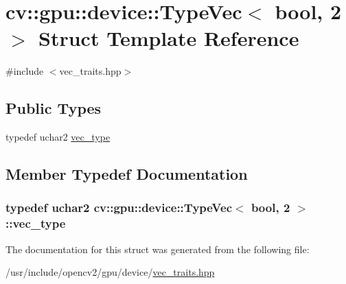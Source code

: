 \hypertarget{structcv_1_1gpu_1_1device_1_1TypeVec_3_01bool_00_012_01_4}{\section{cv\-:\-:gpu\-:\-:device\-:\-:Type\-Vec$<$ bool, 2 $>$ Struct Template Reference}
\label{structcv_1_1gpu_1_1device_1_1TypeVec_3_01bool_00_012_01_4}
}


{\ttfamily \#include $<$vec\-\_\-traits.\-hpp$>$}

\subsection*{Public Types}
\begin{DoxyCompactItemize}
\item 
typedef uchar2 \hyperlink{structcv_1_1gpu_1_1device_1_1TypeVec_3_01bool_00_012_01_4_a0ea13b73f2ce3b86de516771451efa99}{vec\-\_\-type}
\end{DoxyCompactItemize}


\subsection{Member Typedef Documentation}
\hypertarget{structcv_1_1gpu_1_1device_1_1TypeVec_3_01bool_00_012_01_4_a0ea13b73f2ce3b86de516771451efa99}{
\subsubsection[{vec\-\_\-type}]{\setlength{\rightskip}{0pt plus 5cm}typedef uchar2 {\bf cv\-::gpu\-::device\-::\-Type\-Vec}$<$ bool, 2 $>$\-::{\bf vec\-\_\-type}}}\label{structcv_1_1gpu_1_1device_1_1TypeVec_3_01bool_00_012_01_4_a0ea13b73f2ce3b86de516771451efa99}


The documentation for this struct was generated from the following file\-:\begin{DoxyCompactItemize}
\item 
/usr/include/opencv2/gpu/device/\hyperlink{vec__traits_8hpp}{vec\-\_\-traits.\-hpp}\end{DoxyCompactItemize}
